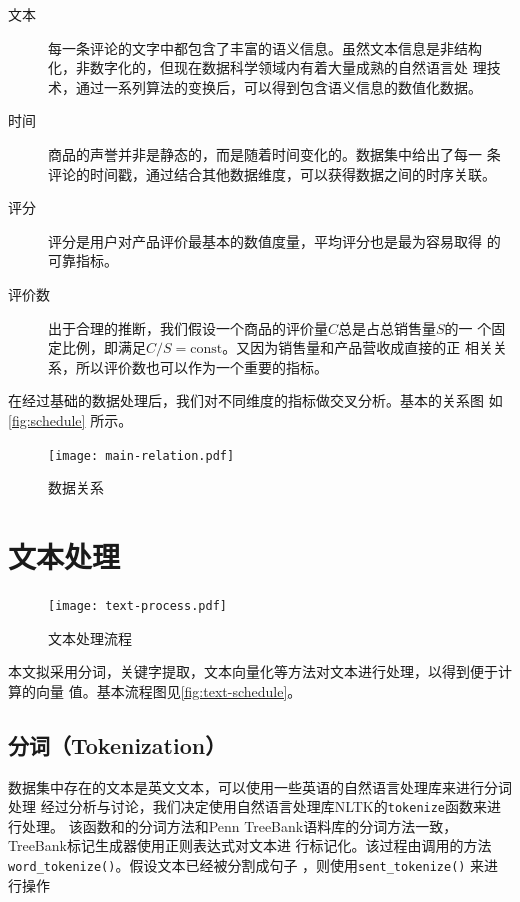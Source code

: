 \begin{description}
    \item [文本] 每一条评论的文字中都包含了丰富的语义信息。虽然文本信息是非结构
        化，非数字化的，但现在数据科学领域内有着大量成熟的{\fKai 自然语言处
        理}技术，通过一系列算法的变换后，可以得到包含语义信息的数值化数据。
    \item [时间] 商品的声誉并非是静态的，而是随着时间变化的。数据集中给出了每一
        条评论的时间戳，通过结合其他数据维度，可以获得数据之间的时序关联。
    \item [评分] 评分是用户对产品评价最基本的数值度量，平均评分也是最为容易取得
        的可靠指标。
    \item [评价数] 出于合理的推断，我们假设一个商品的评价量$C$总是占总销售量$S$的一
        个固定比例，即满足$C/S=\textrm{const}$。又因为销售量和产品营收成直接的正
        相关关系，所以评价数也可以作为一个重要的指标。
\end{description}

在经过基础的数据处理后，我们对不同维度的指标做交叉分析。基本的关系图
如\autoref{fig:schedule} 所示。

\begin{figure}
    \centering
    \texttt{[image: main-relation.pdf]}
    \caption{数据关系}
    \label{fig:schedule}
\end{figure}


\section{文本处理}

\begin{figure}
    \centering
    \texttt{[image: text-process.pdf]}
    \caption{文本处理流程}
    \label{fig:text-schedule}
\end{figure}

本文拟采用分词，关键字提取，文本向量化等方法对文本进行处理，以得到便于计算的向量
值。基本流程图见\autoref{fig:text-schedule}。

\subsection{分词（Tokenization）}
数据集中存在的文本是英文文本，可以使用一些英语的自然语言处理库来进行分词处理
经过分析与讨论，我们决定使用自然语言处理库NLTK的\texttt{tokenize}函数来进行处理。
该函数和的分词方法和Penn TreeBank语料库的分词方法一致，TreeBank标记生成器使用正则表达式对文本进
行标记化。该过程由调用的方法\texttt{word\_tokenize()}。假设文本已经被分割成句子
，则使用\texttt{sent\_tokenize()}
来进行操作

